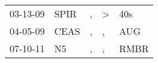 \begin{supertabular}{lllll}
 03-13-09 &  SPIR &  , &  \textgreater &   40s \\
 04-05-09 &  CEAS &  , &             , &   AUG \\
 07-10-11 &    N5 &  , &             , &  RMBR \\
\end{supertabular}
